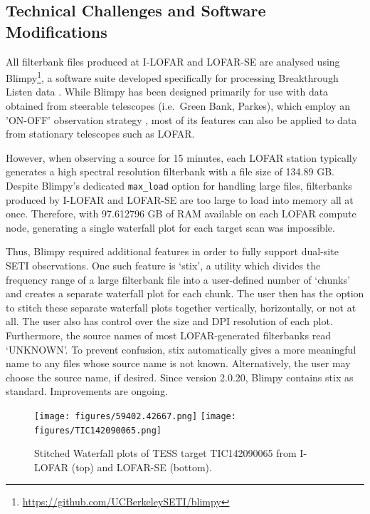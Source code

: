 \documentclass{aastex63}
\begin{document}
\subsection{Technical Challenges and Software Modifications}
All filterbank files produced at I-LOFAR and LOFAR-SE are analysed using Blimpy\footnote{\url{https://github.com/UCBerkeleySETI/blimpy}}, a software suite developed specifically for processing Breakthrough Listen data \citep{2019JOSS....4.1554P}. While Blimpy has been designed primarily for use with data obtained from steerable telescopes (i.e.\ Green Bank, Parkes), which employ an 'ON-OFF' observation strategy \citep{Gajjar_2021_BLGC1}, most of its features can also be applied to data from stationary telescopes such as LOFAR.

However, when observing a source for 15 minutes, each LOFAR station typically generates a high spectral resolution filterbank with a file size of 134.89 GB. Despite Blimpy's dedicated \verb|max_load| option for handling large files, filterbanks produced by I-LOFAR and LOFAR-SE are too large to load into memory all at once. Therefore, with 97.612796 GB of RAM available on each LOFAR compute node, generating a single waterfall plot for each target scan was impossible.

Thus, Blimpy required additional features in order to fully support dual-site SETI observations. One such feature is `stix', a utility which divides the frequency range of a large filterbank file into a user-defined number of `chunks' and creates a separate waterfall plot for each chunk. The user then has the option to stitch these separate waterfall plots together vertically, horizontally, or not at all. The user also has control over the size and DPI resolution of each plot. Furthermore, the source names of most LOFAR-generated filterbanks read `UNKNOWN'. To prevent confusion, stix automatically gives a more meaningful name to any files whose source name is not known. Alternatively, the user may choose the source name, if desired. Since version 2.0.20, Blimpy contains stix as standard. Improvements are ongoing.

\begin{figure}[htp]
    \centering
    \texttt{[image: figures/59402.42667.png]}
    \texttt{[image: figures/TIC142090065.png]}
    \caption{Stitched Waterfall plots of TESS target TIC142090065 from I-LOFAR (top) and LOFAR-SE (bottom).}
    \label{fig:stix}
\end{figure}
\end{document}
